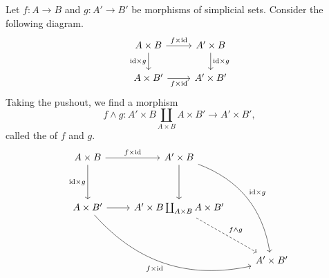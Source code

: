 \documentclass[main.tex]{subfiles}
\begin{document}
\begin{definition}
  \label{def:smash_product}
  Let $f\colon A \to B$ and $g\colon A' \to B'$ be morphisms of simplicial sets. Consider the following diagram.
  \begin{equation*}
    \begin{tikzcd}
      A \times B
      \arrow[r, "f \times \id"]
      \arrow[d, swap, "\id \times g"]
      & A' \times B
      \arrow[d, "\id \times g"]
      \\
      A \times B'
      \arrow[r, swap, "f \times \id"]
      & A' \times B'
    \end{tikzcd}
  \end{equation*}
  Taking the pushout, we find a morphism
  \begin{equation*}
    f \wedge g\colon A' \times B \coprod_{A \times B} A \times B' \to A' \times B',
  \end{equation*}
  called the  of $f$ and $g$.
  \begin{equation*}
    \begin{tikzcd}[row sep=huge]
      A \times B
      \arrow[r, "f \times \id"]
      \arrow[d, swap, "\id \times g"]
      & A' \times B
      \arrow[ddr, bend left, "\id \times g"]
      \arrow[d]
      \\
      A \times B'
      \arrow[r]
      \arrow[rrd, swap, bend right, "f \times \id"]
      & A' \times B \coprod_{A \times B} A \times B'
      \arrow[dr, dashed, "f \wedge g"]
      \\
      && A' \times B'
    \end{tikzcd}
  \end{equation*}
\end{definition}
\end{document}
